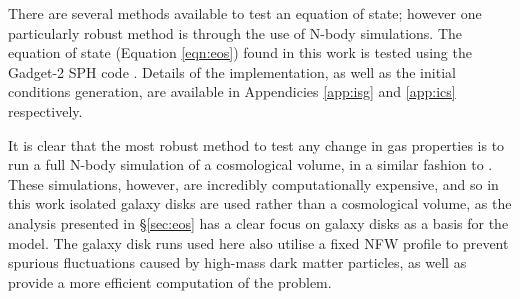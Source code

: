 There are several methods available to test an equation of state; however one particularly robust method is through the use of N-body simulations.
The equation of state (Equation \ref{eqn:eos}) found in this work is tested using the Gadget-2 SPH code \citep{springel_cosmological_2005}.
Details of the implementation, as well as the initial conditions generation, are available in Appendicies \ref{app:isg} and \ref{app:ics} respectively.

It is clear that the most robust method to test any change in gas properties is to run a full N-body simulation of a cosmological volume, in a similar fashion to \citet{schaye2015, volksberger2014}.
These simulations, however, are incredibly computationally expensive, and so in this work isolated galaxy disks are used rather than a cosmological volume, as the analysis presented in \S \ref{sec:eos} has a clear focus on galaxy disks as a basis for the model.
The galaxy disk runs used here also utilise a fixed NFW profile \citep{coe_dark_2010, navarro_structure_1996} to prevent spurious fluctuations caused by high-mass dark matter particles, as well as provide a more efficient computation of the problem.
